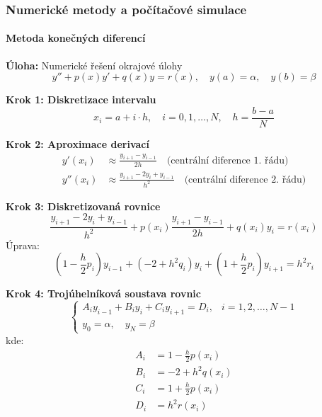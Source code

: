 \subsubsection{Numerické metody a počítačové simulace}
\label{subsubsec:numericke-metody}

\paragraph{Metoda konečných diferencí}

\begin{example}
\label{ex:metoda-konecnych-diferencí}

\noindent\textbf{Úloha:} Numerické řešení okrajové úlohy
\[
y'' + p(x)y' + q(x)y = r(x), \quad y(a) = \alpha, \quad y(b) = \beta
\]

\vspace{1.5\baselineskip}

\noindent\textbf{Krok 1: Diskretizace intervalu}
\[
x_i = a + i\cdot h, \quad i = 0, 1, \dots, N, \quad h = \frac{b-a}{N}
\]

\vspace{1\baselineskip}

\noindent\textbf{Krok 2: Aproximace derivací}
\begin{align*}
y'(x_i) &\approx \frac{y_{i+1} - y_{i-1}}{2h} \quad \text{(centrální diference 1. řádu)} \\
y''(x_i) &\approx \frac{y_{i+1} - 2y_i + y_{i-1}}{h^2} \quad \text{(centrální diference 2. řádu)}
\end{align*}

\vspace{1\baselineskip}

\noindent\textbf{Krok 3: Diskretizovaná rovnice}
\[
\frac{y_{i+1} - 2y_i + y_{i-1}}{h^2} + p(x_i)\frac{y_{i+1} - y_{i-1}}{2h} + q(x_i)y_i = r(x_i)
\]
Úprava:
\[
\left(1 - \frac{h}{2}p_i\right)y_{i-1} + (-2 + h^2 q_i)y_i + \left(1 + \frac{h}{2}p_i\right)y_{i+1} = h^2 r_i
\]

\vspace{1\baselineskip}

\noindent\textbf{Krok 4: Trojúhelníková soustava rovnic}
\[
\begin{cases}
A_i y_{i-1} + B_i y_i + C_i y_{i+1} = D_i, & i = 1, 2, \dots, N-1 \\
y_0 = \alpha, \quad y_N = \beta
\end{cases}
\]
kde:
\begin{align*}
A_i &= 1 - \frac{h}{2}p(x_i) \\
B_i &= -2 + h^2 q(x_i) \\
C_i &= 1 + \frac{h}{2}p(x_i) \\
D_i &= h^2 r(x_i)
\end{align*}


\end{example}
